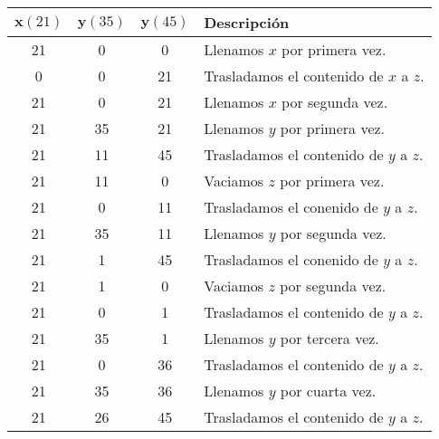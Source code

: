 \begin{center}
\begin{tabular}{c c c l}
	$\boldsymbol{x} (21)$ & $\boldsymbol{y} (35)$ & $\boldsymbol{y} (45)$ & \textbf{Descripción}                   \\
	\toprule
	21                    & 0                     & 0                     & Llenamos $x$ por primera vez.          \\
	0                     & 0                     & 21                    & Trasladamos el contenido de $x$ a $z$. \\
	21                    & 0                     & 21                    & Llenamos $x$ por segunda vez.          \\
	21                    & 35                    & 21                    & Llenamos $y$ por primera vez.          \\
	21                    & 11                    & 45                    & Trasladamos el contenido de $y$ a $z$. \\
	21                    & 11                    & 0                     & Vaciamos $z$ por primera vez.          \\
	21                    & 0                     & 11                    & Trasladamos el conenido de $y$ a $z$.  \\
	21                    & 35                    & 11                    & Llenamos $y$ por segunda vez.          \\
	21                    & 1                     & 45                    & Trasladamos el conenido de $y$ a $z$.  \\
	21                    & 1                     & 0                     & Vaciamos $z$ por segunda vez.          \\
	21                    & 0                     & 1                     & Trasladamos el contenido de $y$ a $z$. \\
	21                    & 35                    & 1                     & Llenamos $y$ por tercera vez.          \\
	21                    & 0                     & 36                    & Trasladamos el contenido de $y$ a $z$. \\
	21                    & 35                    & 36                    & Llenamos $y$ por cuarta vez.           \\
	21                    & 26                    & 45                    & Trasladamos el contenido de $y$ a $z$. \\

\end{tabular}
\end{center}
